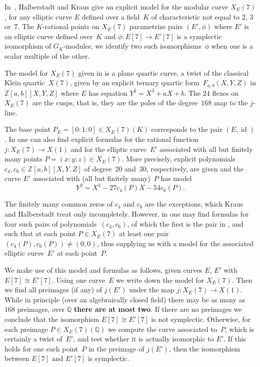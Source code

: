\documentclass[12pt]{amsart}
\newcommand{\Q}{\mathbb{Q}}
\newcommand{\Z}{\mathbb{Z}}
\DeclareMathOperator{\id}{id}
\numberwithin{equation}{section}
\theoremstyle{definition}
\theoremstyle{remark}
\begin{document}
In~\cite{Halberstadt-Kraus-XE7}, Halberstadt and Kraus
give an explicit model for the modular curve $X_E(7)$, for any
elliptic curve $E$ defined over a field~$K$ of characteristic not
equal to $2$, $3$ or~$7$. The $K$-rational points on $X_E(7)$
parametrize pairs $(E',\phi)$ where $E'$ is an elliptic curve defined
over~$K$ and $\phi:E[7]\to E'[7]$ is a symplectic isomorphism of
$G_K$-modules; we  identify two such isomorphisms~$\phi$ when one
  is a scalar multiple of the other.

The model for $X_E(7)$ given in \cite{Halberstadt-Kraus-XE7} is a
plane quartic curve, a twist of the classical Klein quartic~$X(7)$,
given by an explicit ternary quartic form~$F_{a,b}(X,Y,Z)$ in
$\Z[a,b][X,Y,Z]$ where $E$ has equation $Y^2=X^3+aX+b$.  The $24$
flexes on $X_E(7)$ are the cusps, that is, they are the poles of the
degree~$168$ map to the $j$-line.

The base point $P_E=[0:1:0]\in X_E(7)(K)$ corresponds to the pair
$(E,\id)$.  In \cite{Halberstadt-Kraus-XE7} one can also find explicit formulas
for the rational function $j:X_E(7)\to X(1)$ and for the elliptic curve~$E'$
associated with all 
but finitely many points $P=(x:y:z)\in
X_E(7)$. More precisely, 
explicit polynomials $c_4, c_6 \in \Z[a,b][X,Y,Z]$
of degree~$20$ and~$30$, respectively, are given and the curve $E'$ associated with (all but finitely many)~$P$ has model
\[Y^2=X^3-27c_4(P)X-54c_6(P).\]

The finitely many common zeros of $c_4$
and $c_6$ are the exceptions, which Kraus and Halberstadt treat only
incompletely.  However, in \cite{Fisher} one may find formulas for
four such pairs of polynomials~$(c_4,c_6)$, of which the first is the pair in
\cite{Halberstadt-Kraus-XE7}, and such that at each point $P\in
X_E(7)$ at least one pair $(c_4(P),c_6(P))\not=(0,0)$, thus supplying
us with a model for the associated elliptic 
curve~$E'$ at each point~$P$.

We make use of this model and formulas as follows, given 
curves $E$, $E'$ with $E[7]\cong E'[7]$.  Using one curve~$E$ we write
down the model for $X_E(7)$. 
Then we find all preimages (if any) of
$j(E')$ under the map $j:X_E(7)\to X(1)$.  While in principle (over an
algebraically closed field) there may be as many as $168$ preimages,
over $\Q$ {\bf there are at most two}. 
If there are no preimages we conclude that the
isomorphism $E[7]\cong E'[7]$ is not symplectic.  Otherwise, for each
preimage $P\in X_E(7)(\Q)$ we compute the curve associated to~$P$,
which is certainly a twist of~$E'$, and test whether it is actually
isomorphic to $E'$.  If this holds for one such point~$P$ in the
preimage of $j(E')$, then the isomorphism between
$E[7]$ and $E'[7]$ is symplectic.
\end{document}
